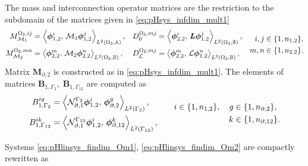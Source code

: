 The mass and interconnection operator matrices are the restriction to the subdomain of the matrices given in \eqref{eq:pHsys_infdim_mult1}
\begin{equation}
\begin{aligned}
{M}_{\mathcal{M}_1}^{\Omega_2, ij} &= \inner[L^2(\Omega_2, \mathbb{A})]{\bm{\phi}_{1, 2}^i}{\mathcal{M}_1\bm{\phi}_{1, 2}^j}, \\
{M}_{\mathcal{M}_2}^{\Omega_2, mn} &= \inner[L^2(\Omega_2, \mathbb{B})]{\bm{\phi}_{2, 2}^m}{\mathcal{M}_2\bm{\phi}_{2, 2}^n}, 
\end{aligned} \quad 
\begin{aligned}
{D}_{0}^{\Omega_2, mj} &= \inner[L^2(\Omega_2, \mathbb{B})]{\bm{\phi}_{2, 2}^i}{\bm{L}\bm{\phi}_{1, 2}^j}, \\
{D}_{\mathcal{L}}^{\Omega_2, mj} &= \inner[L^2(\Omega_2, \mathbb{B})]{\bm{\phi}_{2, 2}^m}{\mathcal{L}\bm{\phi}_{1, 2}^n}, 
\end{aligned}\quad
\begin{aligned}
i,j &\in \{1,n_{1, 2}\}, \\
m,n &\in \{1,n_{2, 2}\}.
\end{aligned}
\end{equation} 
Matrix $\mathbf{M}_{\partial, 2}$ is constructed as in \eqref{eq:pHsys_infdim_mult1}. The elements of matrices  $\mathbf{B}_{1, \Gamma_2}, \; \mathbf{B}_{1, \Gamma_{12}}$ are computed as
\begin{equation}
\begin{aligned}
{B}_{1, \Gamma_{2}}^{ig} &= \inner[L^2(\Gamma_{2})]{\mathcal{N}_{\partial, 1}^{\Gamma_2}\bm{\phi}_{1, 2}^i}{\bm{\phi}_{\partial, 2}^g},  \\
{B}_{1, \Gamma_{12}}^{ik} &= \inner[L^2(\Gamma_{12})]{\mathcal{N}_{\partial, 1}^{\Gamma_{12}}\bm{\phi}_{1, 2}^i}{\bm{\phi}_{\partial, 12}^k}, 
\end{aligned} \qquad 
\begin{aligned}
i \in \{1,n_{1, 2}\}, \quad g &\in \{1,n_{\partial, 2}\}, \\
k &\in \{1,n_{\partial, 12}\}.
\end{aligned}
\end{equation} 

Systems \eqref{eq:pHlinsys_findim_Om1}, \eqref{eq:pHlinsys_findim_Om2} are compactly rewritten as 


